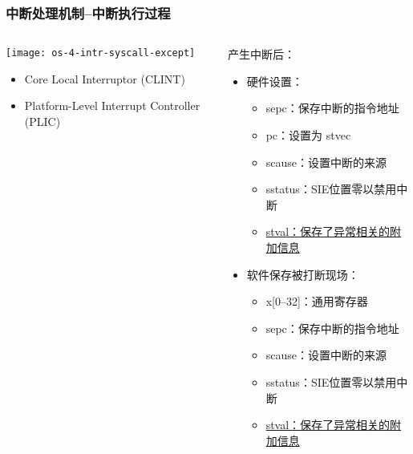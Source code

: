 \begin{frame}[plain,t]
	\frametitle{中断处理机制--中断执行过程}
	\begin{columns}
		
		\begin{column}{0.4\textwidth}
			\centering
			\texttt{[image: os-4-intr-syscall-except]}
			\begin{itemize} \small
				\item Core Local	Interruptor (CLINT)
				\item Platform-Level Interrupt Controller (PLIC)
			\end{itemize}
			
		\end{column}
		
		\begin{column}{0.5\textwidth}
			
			\centering
			产生中断后：
			\begin{itemize} \small 
				\item 硬件设置：\pause
				\begin{itemize} \small 
					\item sepc：保存中断的指令地址	
					\item pc：设置为 stvec
					\item scause：设置中断的来源
					\item sstatus：SIE位置零以禁用中断					
					\item \underline{stval：保存了异常相关的附加信息}
			   \end{itemize}	
				\item 软件保存被打断现场：\pause
				\begin{itemize} \small 
					\item x[0--32]：通用寄存器 	
					\item sepc：保存中断的指令地址
					\item scause：设置中断的来源
					\item sstatus：SIE位置零以禁用中断					
					\item \underline{stval：保存了异常相关的附加信息}
				\end{itemize}											
			\end{itemize}
			
		\end{column}
		
	\end{columns}
	
\end{frame}	

